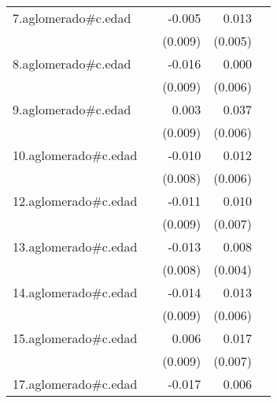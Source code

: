 {\begin{longtable}{l*{4}{D{.}{.}{-1}}}
\addlinespace
7.aglomerado#c.edad&                     &      -0.005         &       0.013\sym{*}  &                     \\
            &                     &     (0.009)         &     (0.005)         &                     \\
\addlinespace
8.aglomerado#c.edad&                     &      -0.016         &       0.000         &                     \\
            &                     &     (0.009)         &     (0.006)         &                     \\
\addlinespace
9.aglomerado#c.edad&                     &       0.003         &       0.037\sym{***}&                     \\
            &                     &     (0.009)         &     (0.006)         &                     \\
\addlinespace
10.aglomerado#c.edad&                     &      -0.010         &       0.012\sym{*}  &                     \\
            &                     &     (0.008)         &     (0.006)         &                     \\
\addlinespace
12.aglomerado#c.edad&                     &      -0.011         &       0.010         &                     \\
            &                     &     (0.009)         &     (0.007)         &                     \\
\addlinespace
13.aglomerado#c.edad&                     &      -0.013         &       0.008         &                     \\
            &                     &     (0.008)         &     (0.004)         &                     \\
\addlinespace
14.aglomerado#c.edad&                     &      -0.014         &       0.013\sym{*}  &                     \\
            &                     &     (0.009)         &     (0.006)         &                     \\
\addlinespace
15.aglomerado#c.edad&                     &       0.006         &       0.017\sym{**} &                     \\
            &                     &     (0.009)         &     (0.007)         &                     \\
\addlinespace
17.aglomerado#c.edad&                     &      -0.017         &       0.006         &                     \\

\end{longtable}}
